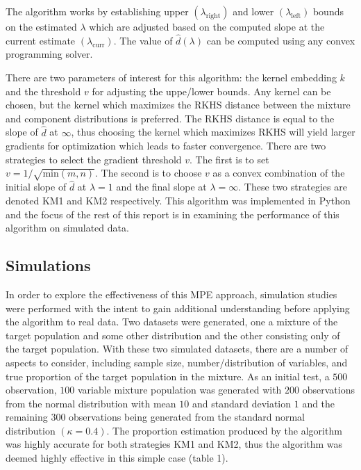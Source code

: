 \documentclass[lineno]{biometrika}
\begin{document}
The algorithm works by establishing upper $(\lambda_{\textrm{right}})$ and lower $(\lambda_{\textrm{left}})$ bounds on the estimated $\lambda$ which are adjusted based on the computed slope at the current estimate $(\lambda_{\textrm{curr}})$. The value of $\hat{d}(\lambda)$ can be computed using any convex programming solver. 

There are two parameters of interest for this algorithm: the kernel embedding $k$ and the threshold $v$ for adjusting the uppe/lower bounds. Any kernel can be chosen, but the kernel which maximizes the RKHS distance between the mixture and component distributions is preferred. The RKHS distance is equal to the slope of $\hat{d}$ at $\infty$, thus choosing the kernel which maximizes RKHS will yield larger gradients for optimization which leads to faster convergence. There are two strategies to select the gradient threshold $v$. The first is to set $v = 1/\sqrt{\textrm{min}(m,n)}$. The second is to choose $v$ as a convex combination of the initial slope of $\hat{d}$ at $\lambda = 1$ and the final slope at $\lambda = \infty$. These two strategies are denoted KM1 and KM2 respectively. This algorithm was implemented in Python and the focus of the rest of this report is in examining the performance of this algorithm on simulated data.

\subsection{Simulations}

In order to explore the effectiveness of this MPE approach, simulation studies were performed with the intent to gain additional understanding before applying the algorithm to real data. Two datasets were generated, one a mixture of the target population and some other distribution and the other consisting only of the target population. With these two simulated datasets, there are a number of aspects to consider, including sample size, number/distribution of variables, and true proportion of the target population in the mixture. As an initial test, a $500$ observation, $100$ variable mixture population was generated with $200$ observations from the normal distribution with mean $10$ and standard deviation $1$ and the remaining $300$ observations being generated from the standard normal distribution $(\kappa = 0.4)$. The proportion estimation produced by the algorithm was highly accurate for both strategies KM1 and KM2, thus the algorithm was deemed highly effective in this simple case (table 1). \newline
\end{document}
